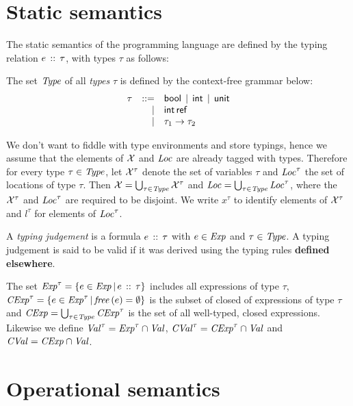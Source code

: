 \documentclass[12pt,a4paper]{report}
\newcommand{\CExp}{\nstyle{CExp}}
\newcommand{\CVal}{\nstyle{CVal}}
\begin{document}

\section{Static semantics}

The static semantics of the programming language are defined by the typing relation
$e\,\mathrel{::}\,\tau$, with types $\tau$ as follows:

\begin{definition}[Types]
  The set $\mathit{Type}$ of all {\em types} $\tau$ is defined by the context-free grammar below:
  \[\begin{array}{rrlll}
    \tau  & ::= & \mathsf{bool} \,\mid\, \mathsf{int} \,\mid\, \mathsf{unit}
          \\ & \mid & \mathsf{int}\,\mathsf{ref}
          \\ & \mid & \tau_1\to\tau_2
  \end{array}\]
\end{definition}

We don't want to fiddle with type environments and store typings, hence we assume that
the elements of $\mathcal{X}$ and $\mathit{Loc}$ are already tagged with types. Therefore for every
type $\tau\in\mathit{Type}$, let $\mathcal{X}^\tau$ denote the set of variables $\tau$ and $\mathit{Loc}^\tau$ the
set of locations of type $\tau$. Then $\mathcal{X}=\bigcup_{\tau\in\mathit{Type}}\mathcal{X}^\tau$ and
$\mathit{Loc}=\bigcup_{\tau\in\mathit{Type}}\mathit{Loc}^\tau$, where the $\mathcal{X}^\tau$ and $\mathit{Loc}^\tau$ are
required to be disjoint. We write $x^\tau$ to identify elements of $\mathcal{X}^\tau$ and
$l^\tau$ for elements of $\mathit{Loc}^\tau$.

\begin{definition}
  A {\em typing judgement} is a formula $e\,\mathrel{::}\,\tau$ with
  $e\in\mathit{Exp}$ and $\tau\in\mathit{Type}$. A typing judgement is said to
  be valid if it was derived using the typing rules {\bf defined
  elsewhere}.
\end{definition}

The set $\mathit{Exp}^\tau = \{e\in\mathit{Exp}\,|\,e\,\mathrel{::}\,\tau\}$ includes all expressions of type $\tau$,
$\CExp^\tau = \{e\in\Exp^\tau\,|\,\free{e}=\emptyset\}$ is the subset of closed of expressions of
type $\tau$ and $\CExp = \bigcup_{\tau\in\Type} \CExp^\tau$ is the set of all well-typed, closed
expressions. Likewise we define $\mathit{Val}^\tau = \mathit{Exp}^\tau\cap\mathit{Val}$, $\CVal^\tau = \CExp^\tau \cap \Val$
and $\CVal = \CExp \cap \Val$.



\section{Operational semantics}
\end{document}
